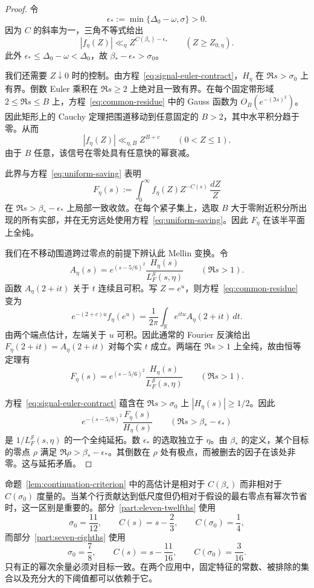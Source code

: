 \begin{proof}
令
\[
 \epsilon_*:=\min\{\Delta_0-\omega,\sigma\}>0.
\]
因为 $C$ 的斜率为一，三角不等式给出
\begin{equation}
 |f_\eta(Z)|\ll_\eta Z^{C(\beta_*)-\epsilon_*}
 \qquad (Z\ge Z_{0,\eta}).
 \label{eq:uniform-saving}
\end{equation}
此外 $\epsilon_*\le\Delta_0-\omega<\Delta_0$，故 $\beta_*-\epsilon_*>\sigma_0$。

我们还需要 $Z\downarrow0$ 时的控制。由方程~\eqref{eq:signal-euler-contract}，$H_\eta$ 在 $\Re s>\sigma_0$ 上有界。倒数 Euler 乘积在 $\Re s\ge2$ 上绝对且一致有界。在每个固定带形域 $2\le\Re s\le B$ 上，方程~\eqref{eq:common-residue} 中的 Gauss 函数为 $O_B(e^{-(\Im s)^2})$。因此矩形上的 Cauchy 定理把围道移动到任意固定的 $B>2$，其中水平积分趋于零。从而
\[
 |f_\eta(Z)|\ll_{\eta,B}Z^{B+c}\qquad(0<Z\le1).
\]
由于 $B$ 任意，该信号在零处具有任意快的幂衰减。

此界与方程~\eqref{eq:uniform-saving} 表明
\[
 F_\eta(s):=\int_0^\infty f_\eta(Z)Z^{-C(s)}\,\frac{dZ}{Z}
\]
在 $\Re s>\beta_*-\epsilon_*$ 上局部一致收敛。在每个紧子集上，选取 $B$ 大于零附近积分所出现的所有实部，并在无穷远处使用方程~\eqref{eq:uniform-saving}。因此 $F_\eta$ 在该半平面上全纯。

我们在不移动围道跨过零点的前提下辨认此 Mellin 变换。令
\[
 A_\eta(s)=e^{(s-5/6)^2}
             \frac{H_\eta(s)}{L_F^{\mathcal S}(s,\eta)}
 \qquad(\Re s>1).
\]
函数 $A_\eta(2+it)$ 关于 $t$ 连续且可积。写 $Z=e^u$，则方程~\eqref{eq:common-residue} 变为
\[
 e^{-(2+c)u}f_\eta(e^u)
   =\frac1{2\pi}\int_{\mathbb R}e^{itu}A_\eta(2+it)\,dt.
\]
由两个端点估计，左端关于 $u$ 可积。因此通常的 Fourier 反演给出 $F_\eta(2+it)=A_\eta(2+it)$ 对每个实 $t$ 成立。两端在 $\Re s>1$ 上全纯，故由恒等定理有
\[
 F_\eta(s)=e^{(s-5/6)^2}
             \frac{H_\eta(s)}{L_F^{\mathcal S}(s,\eta)}
 \qquad(\Re s>1).
\]

方程~\eqref{eq:signal-euler-contract} 蕴含在 $\Re s>\sigma_0$ 上 $|H_\eta(s)|\ge1/2$。因此
\[
 e^{-(s-5/6)^2}\frac{F_\eta(s)}{H_\eta(s)}
 \qquad(\Re s>\beta_*-\epsilon_*)
\]
是 $1/L_F^{\mathcal S}(s,\eta)$ 的一个全纯延拓。数 $\epsilon_*$ 的选取独立于 $\eta$。由 $\beta_*$ 的定义，某个目标的零点 $\rho$ 满足 $\Re\rho>\beta_*-\epsilon_*$。其倒数在 $\rho$ 处有极点，而被删去的因子在该处非零。这与延拓矛盾。
\end{proof}

命题~\ref{lem:continuation-criterion} 中的高估计是相对于 $C(\beta_*)$ 而非相对于 $C(\sigma_0)$ 度量的。当某个行贡献达到低尺度但仍相对于假设的最右零点有幂次节省时，这一区别是重要的。部分~\ref{part:eleven-twelfths} 使用
\[
 \sigma_0=\frac{11}{12},\qquad C(s)=s-\frac23,
 \qquad C(\sigma_0)=\frac14,
\]
而部分~\ref{part:seven-eighths} 使用
\[
 \sigma_0=\frac78,\qquad C(s)=s-\frac{11}{16},
 \qquad C(\sigma_0)=\frac3{16}.
\]
只有正的幂次余量必须对目标一致。在两个应用中，固定特征的常数、被排除的集合以及充分大的下阈值都可以依赖于它。

